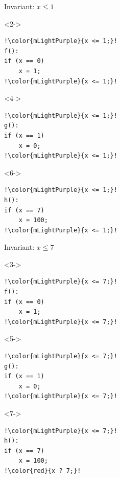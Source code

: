 \documentclass[aspectratio=169,10pt]{beamer}
\begin{document}
\begin{frame}[fragile]{}

\begin{figure}

\noindent\begin{minipage}{.49\textwidth}
Invariant: $x \le 1$
\begin{onlyenv}<2->
\begin{lstlisting}[basicstyle=\scriptsize,escapechar=!]
!\color{mLightPurple}{x <= 1;}!
f():
if (x == 0)
    x = 1;
!\color{mLightPurple}{x <= 1;}!
\end{lstlisting}
\end{onlyenv}

\begin{onlyenv}<4->
\begin{lstlisting}[basicstyle=\scriptsize,escapechar=!]
!\color{mLightPurple}{x <= 1;}!
g():
if (x == 1)
    x = 0;
!\color{mLightPurple}{x <= 1;}!
\end{lstlisting}
\end{onlyenv}

\begin{onlyenv}<6->
\begin{lstlisting}[basicstyle=\scriptsize,escapechar=!]
!\color{mLightPurple}{x <= 1;}!
h():
if (x == 7)
    x = 100;
!\color{mLightPurple}{x <= 1;}!
\end{lstlisting}
\end{onlyenv}

\end{minipage}
\noindent\begin{minipage}{.49\textwidth}
Invariant: $x \le 7$
\begin{onlyenv}<3->
\begin{lstlisting}[basicstyle=\scriptsize,escapechar=!]
!\color{mLightPurple}{x <= 7;}!
f():
if (x == 0)
    x = 1;
!\color{mLightPurple}{x <= 7;}!
\end{lstlisting}
\end{onlyenv}

\begin{onlyenv}<5->
\begin{lstlisting}[basicstyle=\scriptsize,escapechar=!]
!\color{mLightPurple}{x <= 7;}!
g():
if (x == 1)
    x = 0;
!\color{mLightPurple}{x <= 7;}!
\end{lstlisting}
\end{onlyenv}

\begin{onlyenv}<7->
\begin{lstlisting}[basicstyle=\scriptsize,escapechar=!]
!\color{mLightPurple}{x <= 7;}!
h():
if (x == 7)
    x = 100;
!\color{red}{x ? 7;}!
\end{lstlisting}
\end{onlyenv}

\end{minipage}
\end{figure}
\color{white}
\end{frame}
\end{document}
